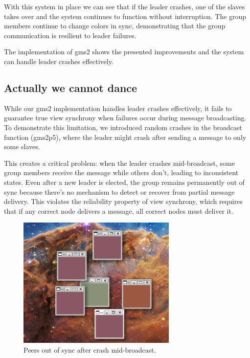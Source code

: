 \documentclass[a4paper, 11pt]{article}
\begin{document}
With this system in place we can see that if the leader crashes, one of the slaves takes over and the system continues to function without interruption. The group members continue to change colors in sync, demonstrating that the group communication is resilient to leader failures.

The implementation of gms2 shows the presented improvements and the system can handle leader crashes effectively.

\subsection{Actually we cannot dance}

While our gms2 implementation handles leader crashes effectively, it fails to guarantee true view synchrony when failures occur during message broadcasting. To demonstrate this limitation, we introduced random crashes in the broadcast function (gms2p5), where the leader might crash after sending a message to only some slaves.

This creates a critical problem: when the leader crashes mid-broadcast, some group members receive the message while others don't, leading to inconsistent states. Even after a new leader is elected, the group remains permanently out of sync because there's no mechanism to detect or recover from partial message delivery. This violates the reliability property of view synchrony, which requires that if any correct node delivers a message, all correct nodes must deliver it.

\begin{figure}[H]
  \centering
  \includegraphics[width=0.7\textwidth]{imgs/out_of_sync.png}
  \caption{Peers out of sync after crash mid-broadcast.}
  \label{fig:out_of_sync}
\end{figure}
\end{document}
